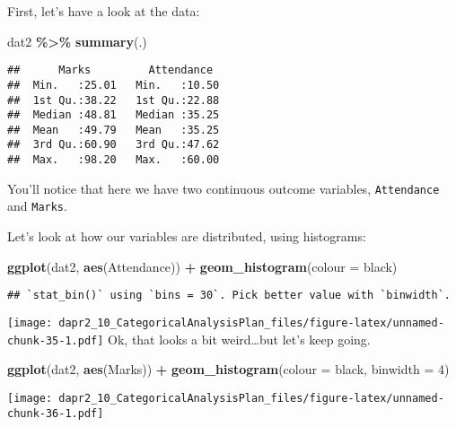 \documentclass[
]{article}
\newenvironment{Shaded}{\begin{snugshade}}{\end{snugshade}}
\newcommand{\AttributeTok}[1]{\textcolor[rgb]{0.13,0.29,0.53}{#1}}
\newcommand{\DecValTok}[1]{\textcolor[rgb]{0.00,0.00,0.81}{#1}}
\newcommand{\FunctionTok}[1]{\textcolor[rgb]{0.13,0.29,0.53}{\textbf{#1}}}
\newcommand{\NormalTok}[1]{#1}
\newcommand{\SpecialCharTok}[1]{\textcolor[rgb]{0.81,0.36,0.00}{\textbf{#1}}}
\newcommand{\StringTok}[1]{\textcolor[rgb]{0.31,0.60,0.02}{#1}}
\begin{document}
First, let's have a look at the data:

\begin{Shaded}
\begin{Highlighting}[]
\NormalTok{dat2 }\SpecialCharTok{\%\textgreater{}\%}
  \FunctionTok{summary}\NormalTok{(.)}
\end{Highlighting}
\end{Shaded}

\begin{verbatim}
##      Marks         Attendance   
##  Min.   :25.01   Min.   :10.50  
##  1st Qu.:38.22   1st Qu.:22.88  
##  Median :48.81   Median :35.25  
##  Mean   :49.79   Mean   :35.25  
##  3rd Qu.:60.90   3rd Qu.:47.62  
##  Max.   :98.20   Max.   :60.00
\end{verbatim}

You'll notice that here we have two continuous outcome variables, \texttt{Attendance} and \texttt{Marks}.

Let's look at how our variables are distributed, using histograms:

\begin{Shaded}
\begin{Highlighting}[]
\FunctionTok{ggplot}\NormalTok{(dat2, }\FunctionTok{aes}\NormalTok{(Attendance)) }\SpecialCharTok{+} \FunctionTok{geom\_histogram}\NormalTok{(}\AttributeTok{colour =} \StringTok{\textquotesingle{}black\textquotesingle{}}\NormalTok{)}
\end{Highlighting}
\end{Shaded}

\begin{verbatim}
## `stat_bin()` using `bins = 30`. Pick better value with `binwidth`.
\end{verbatim}

\texttt{[image: dapr2\_10\_CategoricalAnalysisPlan\_files/figure-latex/unnamed-chunk-35-1.pdf]}
Ok, that looks a bit weird\ldots but let's keep going.

\begin{Shaded}
\begin{Highlighting}[]
\FunctionTok{ggplot}\NormalTok{(dat2, }\FunctionTok{aes}\NormalTok{(Marks)) }\SpecialCharTok{+} \FunctionTok{geom\_histogram}\NormalTok{(}\AttributeTok{colour =} \StringTok{\textquotesingle{}black\textquotesingle{}}\NormalTok{, }\AttributeTok{binwidth =} \DecValTok{4}\NormalTok{)}
\end{Highlighting}
\end{Shaded}

\texttt{[image: dapr2\_10\_CategoricalAnalysisPlan\_files/figure-latex/unnamed-chunk-36-1.pdf]}
\end{document}
